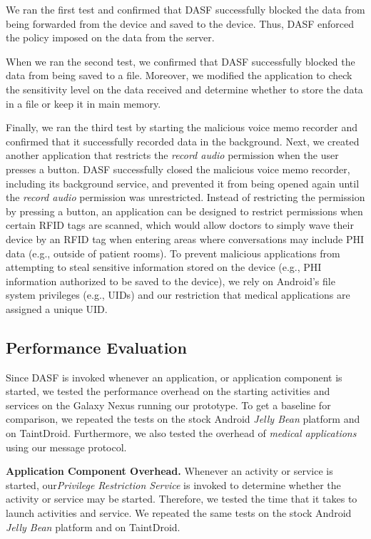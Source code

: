 We ran the first test and confirmed that DASF successfully
blocked the data from being forwarded from the device and saved to the device.
Thus, DASF enforced the policy imposed on the data from the
server.

When we ran the second test, we confirmed that DASF
successfully blocked the data from being saved to a file.  Moreover, we
modified the application to check the sensitivity level on the data
received and determine whether to store the data in a file or keep it
in main memory.

Finally, we ran the third test by starting the malicious
voice memo recorder and confirmed that it successfully recorded data in the
background.  Next, we created another application that restricts the
\textit{record audio} permission when the user presses a button.  DASF
successfully closed the malicious voice memo recorder, including its
background service, and prevented it from being opened again until
the \textit{record audio} permission was unrestricted.  Instead of
restricting the permission by pressing a button, an application can
be designed to restrict permissions when certain RFID tags are
scanned, which would allow doctors to simply wave their device by
an RFID tag when entering areas where conversations may include
PHI data (e.g., outside of patient rooms).  To prevent malicious
applications from attempting to steal sensitive information stored on
the device (e.g., PHI information authorized to be saved to the device),
we rely on Android's file system privileges (e.g., UIDs) and our restriction
that medical applications are assigned a unique UID.  

\vspace{-3mm}
\subsection{Performance Evaluation}

Since DASF is invoked whenever an application, or application
component is started, we tested the performance overhead on the starting
activities and services on the Galaxy Nexus running our prototype.  To get
a baseline for comparison, we repeated the tests on the stock Android \textit{Jelly Bean}
platform and on TaintDroid.  Furthermore, we also tested the overhead of
\textit{medical applications} using our message protocol.

\textbf{Application Component Overhead.}  Whenever an activity or service is
started, our\textit{Privilege Restriction Service} is invoked to determine
whether the activity or service may be started.  Therefore, we tested
the time that it takes to launch activities and service.  We repeated
the same tests on the stock Android \textit{Jelly Bean} platform and on TaintDroid.

